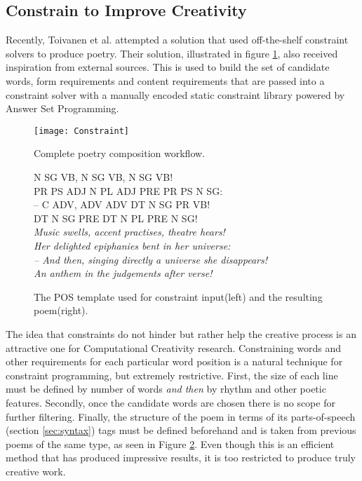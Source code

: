 \subsection{Constrain to Improve Creativity}
\label{sec:con}
Recently, Toivanen et al. attempted a solution that used off-the-shelf constraint solvers\cite{toivanen2013harnessing} to produce poetry. Their solution, illustrated in figure \ref{fig:con1}, also received inspiration from external sources. This is used to build the set of candidate words, form requirements and content requirements that are passed into a constraint solver with a manually encoded static constraint library powered by Answer Set Programming.

\begin{figure}[h!]
\centering
\texttt{[image: Constraint]}
\caption{Complete poetry composition workflow.}
\label{fig:con1}
\end{figure}

\begin{figure}[h!]
\begin{multicols}{2}
N SG VB, N SG VB, N SG VB!\\
PR PS ADJ N PL ADJ PRE PR PS N SG:\\
– C ADV, ADV ADV DT N SG PR VB!\\
\columnbreak DT N SG PRE DT N PL PRE N SG!\\
\textit{Music swells, accent practises, theatre hears!\\
Her delighted epiphanies bent in her universe:\\
– And then, singing directly a universe she disappears!\\
An anthem in the judgements after verse!
}
\end{multicols}
\caption{The POS template used for constraint input(left) and the resulting poem(right).}
\label{fig:con2}
\end{figure}

The idea that constraints do not hinder but rather help the creative process is an attractive one for Computational Creativity research. Constraining words and other requirements for each particular word position is a natural technique for constraint programming, but extremely restrictive. First, the size of each line must be defined by number of words \textit{and then} by rhythm and other poetic features. Secondly, once the candidate words are chosen there is no scope for further filtering. Finally, the structure of the poem in terms of its parts-of-speech (section \ref{sec:syntax}) tags must be defined beforehand and is taken from previous poems of the same type, as seen in Figure \ref{fig:con2}. Even though this is an efficient method that has produced impressive results, it is too restricted to produce truly creative work.


